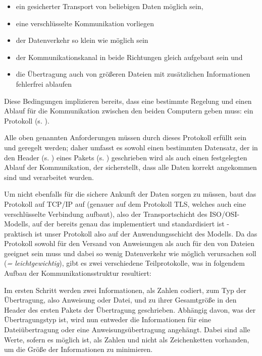 \begin{itemize}
\item ein gesicherter Transport von beliebigen Daten möglich sein,
\item eine verschlüsselte Kommunikation vorliegen
\item der Datenverkehr so klein wie möglich sein
\item der Kommunikationskanal in beide Richtungen gleich aufgebaut sein und
\item die Übertragung auch von größeren Dateien mit zusätzlichen Informationen fehlerfrei ablaufen
\end{itemize}

Diese Bedingungen implizieren bereits, dass eine bestimmte Regelung und einen Ablauf für die Kommunikation zwischen den beiden Computern geben muss: ein Protokoll (s. ).\par
Alle oben genannten Anforderungen müssen durch dieses Protokoll erfüllt sein und geregelt werden; daher umfasst es sowohl einen bestimmten Datensatz, der in den Header (s. ) eines Pakets (s. ) geschrieben wird als auch einen festgelegten Ablauf der Kommunikation, der sicherstellt, dass alle Daten korrekt angekommen sind und verarbeitet wurden.\par 
Um nicht ebenfalls für die sichere Ankunft der Daten sorgen zu müssen, baut das Protokoll auf TCP/IP auf (genauer auf dem Protokoll TLS, welches auch eine verschlüsselte Verbindung aufbaut), also der Transportschicht des ISO/OSI-Modells, auf der bereits genau das implementiert und standardisiert ist - praktisch ist unser Protokoll also auf der Anwendungsschicht des Modells.
Da das Protokoll sowohl für den Versand von Anweisungen als auch für den von Dateien geeignet sein muss und dabei so wenig Datenverkehr wie möglich verursachen soll (\textit{= leichtgewichtig}), gibt es zwei verschiedene Teilprotokolle, was in folgendem Aufbau der Kommunikationsstruktur resultiert:\par
Im ersten Schritt werden zwei Informationen, als Zahlen codiert, zum Typ der Übertragung, also Anweisung oder Datei, und zu ihrer Gesamtgröße in den Header des ersten Pakets der Übertragung geschrieben.
Abhängig davon, was der Übertragungstyp ist, wird nun entweder die Informationen für eine Dateiübertragung oder eine Anweisungsübertragung angehängt.
Dabei sind alle Werte, sofern es möglich ist, als Zahlen und nicht als Zeichenketten vorhanden, um die Größe der Informationen zu minimieren.\\\par
